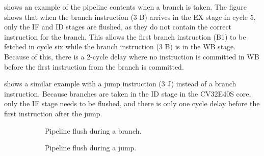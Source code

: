  shows an example of the pipeline contents when a branch is taken. The figure shows that when the branch instruction (3 B) arrives in the EX stage in cycle 5, only the IF and ID stages are flushed, as they do not contain the correct instruction for the branch. This allows the first branch instruction (B1) to be fetched in cycle six while the branch instruction (3 B) is in the WB stage. Because of this, there is a 2-cycle delay where no instruction is committed in WB before the first instruction from the branch is committed.

 shows a similar example with a jump instruction (3 J) instead of a branch instruction. Because branches are taken in the ID stage in the CV32E40S core, only the IF stage needs to be flushed, and there is only one cycle delay before the first instruction after the jump.


\begin{figure}
     \centering
     \begin{subfigure}[b]{0.48\textwidth}
        \centering
        \resizebox{1\textwidth}{!}{%
            
        }
        \caption{Pipeline flush during a branch.}
        \label{fig:branch_flush}
     \end{subfigure}
     \hfill
     \begin{subfigure}[b]{0.48\textwidth}
        \centering
        \resizebox{1\textwidth}{!}{%
            
        }
        \caption{Pipeline flush during a jump.}
        \label{fig:jump_flush}
     \end{subfigure}
     
    \caption{}
    \label{fig:flush graphs}
\end{figure}






%            
%        
%            
%            
%    



